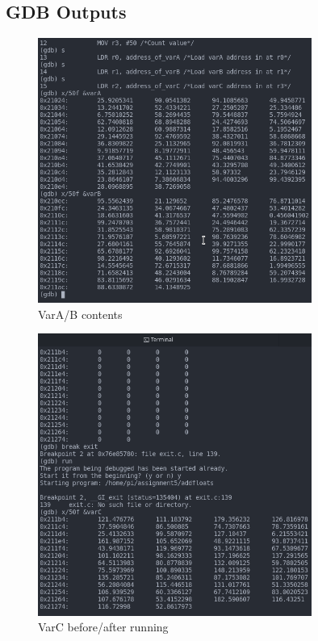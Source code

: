 \documentclass{article}
\begin{document}
	\subsection{GDB Outputs}
	\begin{figure}[h!]
		\centering
		\includegraphics[width=0.8\textwidth]{varA_varB.png}
		\caption{VarA/B contents}
	\end{figure}
	\newpage
	\begin{figure}[h!]
		\centering
		\includegraphics[width=0.8\textwidth]{VarC_before_after.png}
		\caption{VarC before/after running}
	\end{figure}
	
	
\end{document}
